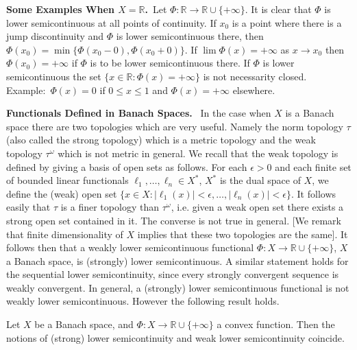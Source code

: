 \medskip
\noindent
{\bf Some Examples When {\boldmath$X=\mathbb{R}$}.}~Let
$\Phi:\mathbb{R}\to \mathbb{R}\cup \{+\infty\}$. It is clear that
$\Phi$ is lower semicontinuous at all points of continuity. If $x_{0}$
is a point where there is a jump discontinuity and $\Phi$ is lower
semicontinuous there, then $\Phi(x_{0})=\min
\{\Phi(x_{0}-0),\Phi(x_{0}+0)\}$. If $\lim \Phi(x)=+\infty$ as $x\to
x_{0}$ then $\Phi(x_{0})=+\infty$ if $\Phi$ is to be lower
semicontinuous there. If $\Phi$ is lower semicontinuous the set
$\{x\in \mathbb{R}:\Phi(x)=+\infty\}$ is not necessarity
closed. Example:~$\Phi(x)=0$ if $0\leq x\leq 1$ and $\Phi(x)=+\infty$
elsewhere. 

\medskip
\noindent
{\bf Functionals Defined in Banach Spaces.}~ In the case when $X$ is a
Banach space there are two topologies which are very useful. Namely
the norm topology $\tau$ (also called the strong topology) which is a
metric topology and the weak topology $\tau^{\omega}$ which is not
metric in general. We recall that the weak topology is defined by
giving a basis of open sets as follows. For each $\epsilon>0$ and each
finite set of bounded linear functionals $\ell_{1},\ldots,\ell_{n}\in
X^{*}$, $X^{*}$ is the dual space of $X$, we define the (weak) open
set $\{x\in
X:|\ell_{1}(x)|<\epsilon,\ldots,|\ell_{n}(x)|<\epsilon\}$. It follows
easily that $\tau$ is a finer topology than $\tau^{\omega}$, i.e.\@
given a weak open set there exists a strong open set contained in
it. The converse is not true in general. [We remark that finite
  dimensionality of $X$ implies that these two topologies are the
  same]. It follows then that a weakly lower semicontinuous functional
$\Phi:X\to \mathbb{R}\cup \{+\infty\}$, $X$ a Banach space, is
(strongly) lower semicontinuous. A similar statement holds for the
sequential lower semicontinuity, since every strongly convergent
sequence is weakly convergent. In general, a (strongly) lower
semicontinuous functional is not weakly lower semicontinuous. However
the following result holds.

\begin{theorem}\label{chap1-thm1.4}
Let $X$ be a Banach space, and $\Phi:X\to \mathbb{R}\cup \{+\infty\}$
a convex function. Then the notions of (strong) lower semicontinuity
and weak lower semicontinuity coincide.
\end{theorem}

